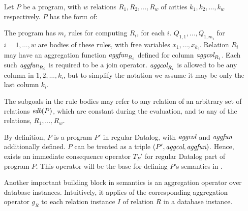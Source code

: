 Let $P$ be a \datalogra program, with $w$ \idb relations $R_1, R_2, \dots, R_w$ of arities $k_1, k_2, \dots, k_w$ respectively. $P$ has the form of:
\begin{figure}[h!]


\end{figure}

The program has $m_i$ rules for computing $R_i$, for each $i$. $Q_{1, 1}, \dots, Q_{1, m_i}$ for $i = 1, \dots, w$ are bodies of these rules, with free variables $x_1, \dots, x_{k_i}$. Relation $R_i$ may have an aggregation function $\textit{aggfun}_{R_i}$ defined for column $\textit{aggcol}_{R_i}$. Each such $\textit{aggfun}_{R_i}$ is required to be a join operator. $\textit{aggcol}_{R_i}$ is allowed to be any column in $1, 2, \dots, k_i$, but to simplify the notation we assume it may be only the last column $k_i$.

The subgoals in the rule bodies may refer to any relation of an arbitrary set of \edb relations $\textit{edb}(P)$, which are constant during the evaluation, and to any of the \idb relations, $R_1, \dots, R_w$.

By definition, $P$ is a program $P'$ in regular Datalog, with $\textit{aggcol}$ and $\textit{aggfun}$ additionally defined. $P$ can be treated as a triple $(P', \textit{aggcol}, \textit{aggfun})$. Hence, exists an immediate consequence operator $T_P'$ for regular Datalog part of program $P$. This operator will be the base for defining $P$'s semantics in \datalogra.


Another important building block in \datalogra semantics is an aggregation operator over database instances. Intuitively, it applies of the corresponding aggregation operator $g_R$ to each relation instance $I$ of relation $R$ in a database instance.

